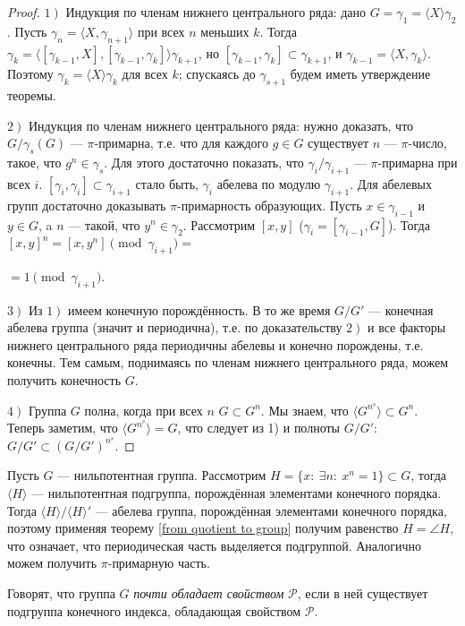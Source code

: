 \documentclass[10pt,a4paper]{article}%
\begin{document}
\begin{proof} $\left.1\right)$ Индукция по членам нижнего центрального
ряда: дано $G=\gamma_1=\langle X\rangle\gamma_2$. Пусть
$\gamma_n=\langle X,\gamma_{n+1}\rangle$ при всех $n$ меньших $k$.
Тогда
$\gamma_k=\langle{[\gamma_{k-1},X],[\gamma_{k-1},\gamma_k]}\rangle\gamma_{k+1}$,
но $[\gamma_{k-1},\gamma_k]\subset\gamma_{k+1}$, и
$\gamma_{k-1}=\langle X,\gamma_k\rangle$. Поэтому
$\gamma_k=\langle X\rangle\gamma_k$ для всех $k$; спускаясь до
$\gamma_{s+1}$ будем иметь утверждение теоремы.

$\left.2\right)$ Индукция по членам нижнего центрального ряда:
нужно доказать, что $G/\gamma_s(G)$ --- $\pi$-примарна, т.е. что
для каждого $g\in G$ существует $n$ --- $\pi$-число, такое, что
$g^n\in\gamma_s$. Для этого достаточно показать, что
$\gamma_i/\gamma_{i+1}$ --- $\pi$-примарна при всех $i$.
$[\gamma_i,\gamma_i]\subset\gamma_{i+1}$ стало быть, $\gamma_i$
абелева по модулю $\gamma_{i+1}$. Для абелевых групп достаточно
доказывать $\pi$-примарность образующих. Пусть $x\in\gamma_{i-1}$
и $y\in G$, a $n$ --- такой, что $y^n\in\gamma_2$. Рассмотрим
$[x,y]$ ($\gamma_i=[\gamma_{i-1},G]$). Тогда
$[x,y]^n=[x,y^n]\pmod{\gamma_{i+1}}=$

\hfill$=1\pmod{\gamma_{i+1}}$.

$\left.3\right)$ Из $\left.1\right)$ имеем конечную порождённость.
В то же время $G/G'$
--- конечная абелева группа (значит и периодична), т.е. по доказательству $\left.2\right)$
и все факторы нижнего центрального ряда периодичны абелевы и
конечно порождены, т.е. конечны. Тем самым, поднимаясь по членам
нижнего центрального ряда, можем получить конечность $G$.

$\left.4\right)$  Группа $G$ полна, когда при всех $n$ $G\subset
G^n$. Мы знаем, что $\langle G^{n^s}\rangle\subset G^n$. Теперь
заметим, что $\langle G^{n^s}\rangle=G$, что следует из 1) и
полноты $G/G'$: $G/G'\subset(G/G')^{n^{s}}$.\end{proof}

Пусть $G$ --- нильпотентная группа. Рассмотрим $H=\{x:~\exists
n:~x^n=1\}\subset G$, тогда $\langle H\rangle$
--- нильпотентная подгруппа, порождённая элементами конечного порядка. Тогда
$\langle H\rangle/\langle H\rangle'$ --- абелева группа,
порождённая элементами конечного порядка, поэтому применяя теорему
\ref{from quotient to group} получим равенство $H=\angle{H}$, что
означает, что периодическая часть выделяется подгруппой.
Аналогично можем получить $\pi$-примарную часть.

Говорят, что группа $G$ {\em почти обладает
свойством} $\mathcal{P}$,
если в ней существует подгруппа конечного индекса, обладающая
свойством $\mathcal{P}$.
\end{document}
